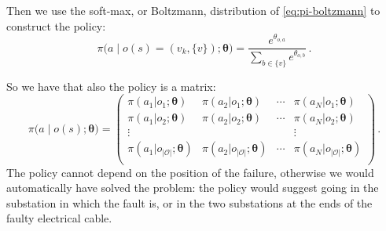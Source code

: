 Then we use the soft-max, or Boltzmann, distribution of \eqref{eq:pi-boltzmann} to construct the policy:
\begin{equation}
    \pi \Big( a \;\big|\; o(s) = (v_k, \{v\}); \boldsymbol \theta \Big) = \frac{e^{\theta_{o,a} }}{\sum_{b \in \{v\}} e^{\theta_{o,b} }} \,.
    \label{eq:parameterizedpolicy}
\end{equation}

So we have that also the policy is a matrix:
\begin{equation}
    \pi \Big( a \;\big|\; o(s); \boldsymbol \theta \Big) = \begin{pmatrix}
        \pi(a_1 | o_1; \boldsymbol \theta) & \pi(a_2 | o_1; \boldsymbol \theta) & \cdots & \pi(a_N | o_1; \boldsymbol \theta) \\
        \pi(a_1 | o_2; \boldsymbol \theta) & \pi(a_2 | o_2; \boldsymbol \theta) & \cdots & \pi(a_N | o_2; \boldsymbol \theta) \\
        \vdots            &                   &        & \vdots            \\
        \pi(a_1 | o_{|\mathcal O|}; \boldsymbol \theta) & \pi(a_2 | o_{|\mathcal O|}; \boldsymbol \theta)  & \cdots &  \pi(a_N | o_{|\mathcal O|}; \boldsymbol \theta) \\
    \end{pmatrix} \, .
\end{equation}
The policy cannot depend on the position of the failure, otherwise we would automatically have solved the problem: the policy would suggest going in the substation in which the fault is, or in the two substations at the ends of the faulty electrical cable.


